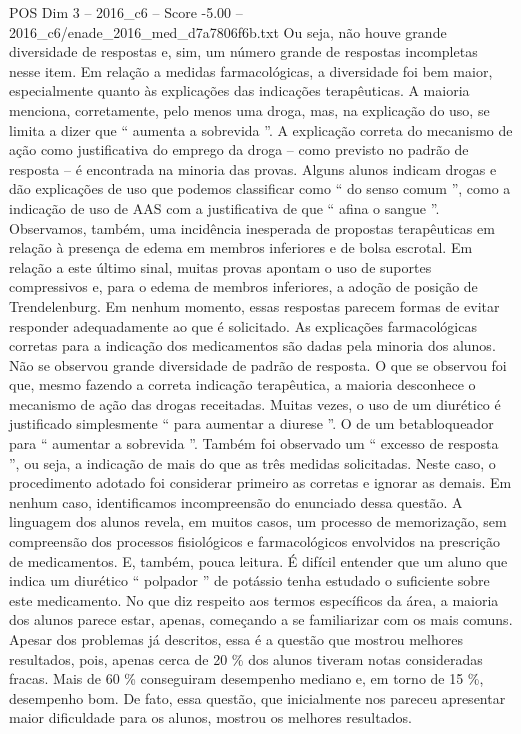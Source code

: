 \begin{textsample}{POS Dim 3 – 2016\_c6 – Score -5.00 – 2016\_c6/enade\_2016\_med\_d7a7806f6b.txt}
Ou seja, não houve grande diversidade de respostas e, sim, um número grande de respostas incompletas nesse item.
Em relação a medidas farmacológicas, a diversidade foi bem maior, especialmente quanto às explicações das indicações terapêuticas.
A maioria menciona, corretamente, pelo menos uma droga, mas, na explicação do uso, se limita a dizer que “ aumenta a sobrevida ”.
A explicação correta do mecanismo de ação como justificativa do emprego da droga – como previsto no padrão de resposta – é encontrada na minoria das provas.
Alguns alunos indicam drogas e dão explicações de uso que podemos classificar como “ do senso comum ”, como a indicação de uso de AAS com a justificativa de que “ afina o sangue ”.
Observamos, também, uma incidência inesperada de propostas terapêuticas em relação à presença de edema em membros inferiores e de bolsa escrotal.
Em relação a este último sinal, muitas provas apontam o uso de suportes compressivos e, para o edema de membros inferiores, a adoção de posição de Trendelenburg.
Em nenhum momento, essas respostas parecem formas de evitar responder adequadamente ao que é solicitado.
As explicações farmacológicas corretas para a indicação dos medicamentos são dadas pela minoria dos alunos.
Não se observou grande diversidade de padrão de resposta.
O que se observou foi que, mesmo fazendo a correta indicação terapêutica, a maioria desconhece o mecanismo de ação das drogas receitadas.
Muitas vezes, o uso de um diurético é justificado simplesmente “ para aumentar a diurese ”.
O de um betabloqueador para “ aumentar a sobrevida ”.
Também foi observado um “ excesso de resposta ”, ou seja, a indicação de mais do que as três medidas solicitadas.
Neste caso, o procedimento adotado foi considerar primeiro as corretas e ignorar as demais.
Em nenhum caso, identificamos incompreensão do enunciado dessa questão.
A linguagem dos alunos revela, em muitos casos, um processo de memorização, sem compreensão dos processos fisiológicos e farmacológicos envolvidos na prescrição de medicamentos.
E, também, pouca leitura.
É difícil entender que um aluno que indica um diurético “ polpador ” de potássio tenha estudado o suficiente sobre este medicamento.
No que diz respeito aos termos específicos da área, a maioria dos alunos parece estar, apenas, começando a se familiarizar com os mais comuns.
Apesar dos problemas já descritos, essa é a questão que mostrou melhores resultados, pois, apenas cerca de 20 \% dos alunos tiveram notas consideradas fracas.
Mais de 60 \% conseguiram desempenho mediano e, em torno de 15 \%, desempenho bom.
De fato, essa questão, que inicialmente nos pareceu apresentar maior dificuldade para os alunos, mostrou os melhores resultados.

\end{textsample}
